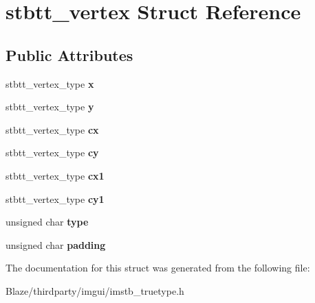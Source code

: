 \hypertarget{structstbtt__vertex}{}\section{stbtt\+\_\+vertex Struct Reference}
\label{structstbtt__vertex}
\subsection*{Public Attributes}
\begin{DoxyCompactItemize}
\item 
\mbox{\label{structstbtt__vertex_a81773edbe760d0e090561a3c1e86c919}} 
stbtt\+\_\+vertex\+\_\+type {\bfseries x}
\item 
\mbox{\label{structstbtt__vertex_a9052065ca544b63d537325b246928cfc}} 
stbtt\+\_\+vertex\+\_\+type {\bfseries y}
\item 
\mbox{\label{structstbtt__vertex_a43835489e2a151b31cb100d20f8adeae}} 
stbtt\+\_\+vertex\+\_\+type {\bfseries cx}
\item 
\mbox{\label{structstbtt__vertex_a5610d6335aa6962d970fc7fd2225545e}} 
stbtt\+\_\+vertex\+\_\+type {\bfseries cy}
\item 
\mbox{\label{structstbtt__vertex_a1c45a8d41727b24b84f97a944f2b800a}} 
stbtt\+\_\+vertex\+\_\+type {\bfseries cx1}
\item 
\mbox{\label{structstbtt__vertex_a68227d28643f5667064fa3c385f4ea7d}} 
stbtt\+\_\+vertex\+\_\+type {\bfseries cy1}
\item 
\mbox{\label{structstbtt__vertex_aa325b3707b88e7e104c0de46bb2bf395}} 
unsigned char {\bfseries type}
\item 
\mbox{\label{structstbtt__vertex_a8bd328747e8ea018612960a52e3e3ede}} 
unsigned char {\bfseries padding}
\end{DoxyCompactItemize}


The documentation for this struct was generated from the following file\+:\begin{DoxyCompactItemize}
\item 
Blaze/thirdparty/imgui/imstb\+\_\+truetype.\+h\end{DoxyCompactItemize}
